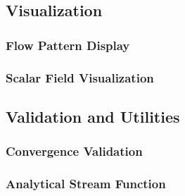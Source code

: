 \subsection{Visualization}

\subsubsection{Flow Pattern Display}


\subsubsection{Scalar Field Visualization}


\subsection{Validation and Utilities}

\subsubsection{Convergence Validation}


\subsubsection{Analytical Stream Function}



